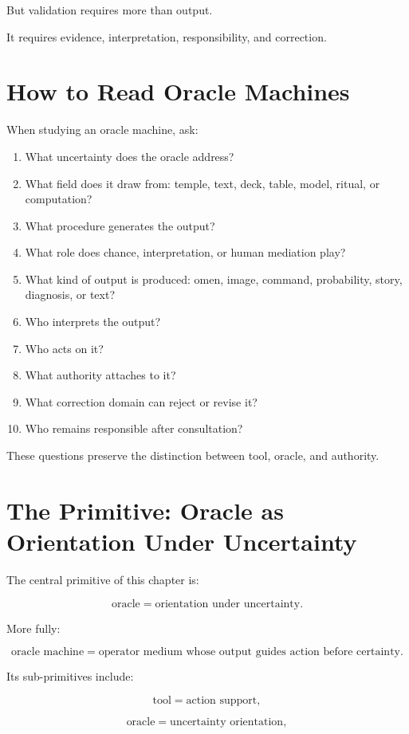\documentclass[11pt]{book}
\begin{document}
But validation requires more than output.

It requires evidence, interpretation, responsibility, and correction.

\section{How to Read Oracle Machines}

When studying an oracle machine, ask:

\begin{enumerate}[label=\arabic*.]
    \item What uncertainty does the oracle address?
    \item What field does it draw from: temple, text, deck, table, model, ritual, or computation?
    \item What procedure generates the output?
    \item What role does chance, interpretation, or human mediation play?
    \item What kind of output is produced: omen, image, command, probability, story, diagnosis, or text?
    \item Who interprets the output?
    \item Who acts on it?
    \item What authority attaches to it?
    \item What correction domain can reject or revise it?
    \item Who remains responsible after consultation?
\end{enumerate}

These questions preserve the distinction between tool, oracle, and authority.

\section{The Primitive: Oracle as Orientation Under Uncertainty}

The central primitive of this chapter is:

\[
\text{oracle} = \text{orientation under uncertainty}.
\]

More fully:

\[
\text{oracle machine}
=
\text{operator medium whose output guides action before certainty}.
\]

Its sub-primitives include:

\[
\text{tool} = \text{action support},
\]

\[
\text{oracle} = \text{uncertainty orientation},
\]
\end{document}

